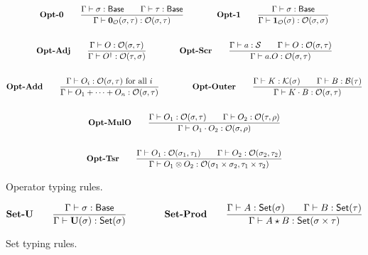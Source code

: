 \documentclass{article}
\begin{document}
\begin{figure}[h]
    \begin{gather*}
        \textbf{Opt-0} \qquad
        \frac{\Gamma \vdash \sigma : \mathsf{Base} \qquad \Gamma \vdash \tau : \mathsf{Base}}{\Gamma \vdash \mathbf{0}_\mathcal{O}(\sigma, \tau) : \mathcal{O}(\sigma, \tau)} 
        \qquad \qquad
        \textbf{Opt-1} \qquad
        \frac{\Gamma \vdash \sigma : \mathsf{Base}}{\Gamma \vdash \mathbf{1}_\mathcal{O}(\sigma) : \mathcal{O}(\sigma, \sigma)} \\
        \\
        \textbf{Opt-Adj} \qquad
        \frac{\Gamma \vdash O : \mathcal{O}(\sigma, \tau)}{\Gamma \vdash O^\dagger : \mathcal{O}(\tau, \sigma)} 
        \qquad \qquad
        \textbf{Opt-Scr} \qquad
        \frac{\Gamma \vdash a : \mathcal{S} \qquad \Gamma \vdash O : \mathcal{O}(\sigma, \tau)}{\Gamma \vdash a.O : \mathcal{O}(\sigma, \tau)} \\
        \\
        \textbf{Opt-Add} \qquad
        \frac{\Gamma \vdash O_i : \mathcal{O}(\sigma, \tau) \text{ for all $i$}}{\Gamma \vdash O_1 + \cdots + O_n : \mathcal{O}(\sigma, \tau)}
        \qquad \qquad
        \textbf{Opt-Outer} \qquad
        \frac{\Gamma\vdash K : \mathcal{K}(\sigma) \qquad \Gamma\vdash B : \mathcal{B}(\tau)}{\Gamma\vdash K \cdot B : \mathcal{O}(\sigma, \tau)} \\
        \\
        \textbf{Opt-MulO} \qquad
        \frac{\Gamma \vdash O_1 : \mathcal{O}(\sigma, \tau) \qquad \Gamma \vdash O_2 : \mathcal{O}(\tau, \rho)}{\Gamma \vdash O_1 \cdot O_2 : \mathcal{O}(\sigma, \rho)} \\
        \\
        \textbf{Opt-Tsr} \qquad
        \frac{\Gamma \vdash O_1 : \mathcal{O}(\sigma_1, \tau_1) \qquad \Gamma \vdash O_2 : \mathcal{O}(\sigma_2, \tau_2)} {\Gamma \vdash O_1 \otimes O_2 : \mathcal{O}(\sigma_1 \times \sigma_2, \tau_1 \times \tau_2)}
    \end{gather*}
    \caption{Operator typing rules.}
\end{figure}


\begin{figure}[h]
    \begin{gather*}
        \textbf{Set-U} \qquad
        \frac{\Gamma \vdash \sigma : \mathsf{Base}}{\Gamma \vdash \mathbf{U}(\sigma) : \mathsf{Set}(\sigma)} 
        \qquad \qquad
        \textbf{Set-Prod} \qquad
        \frac{\Gamma \vdash A : \mathsf{Set}(\sigma) \qquad \Gamma \vdash B : \mathsf{Set}(\tau)}{\Gamma \vdash A \star B : \mathsf{Set}(\sigma \times \tau)}
    \end{gather*}
    \caption{Set typing rules.}
\end{figure}
\end{document}
